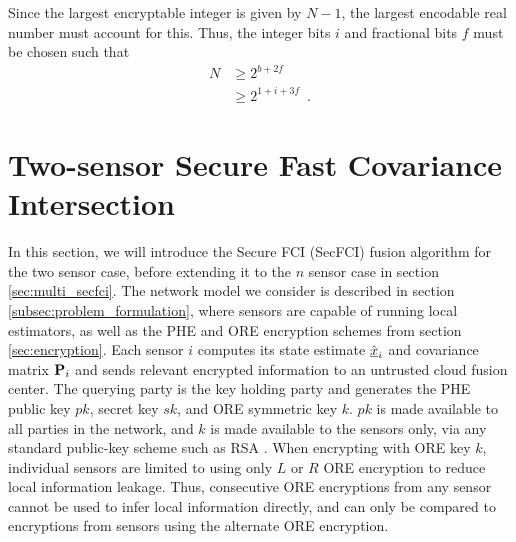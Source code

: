 \documentclass[letterpaper, 10 pt, journal, twoside]{ieeetran}  %
\begin{document}
Since the largest encryptable integer is given by $N-1$, the largest encodable real number must account for this. Thus, the integer bits $i$ and fractional bits $f$ must be chosen such that
\begin{equation}\label{eqn:qmn_max}
   \begin{aligned}
      N &\geq 2^{b+2f}\\
      &\geq 2^{1+i+3f}\enspace.
   \end{aligned}
\end{equation}




\section{Two-sensor Secure Fast Covariance Intersection} \label{sec:secfci}
In this section, we will introduce the Secure FCI (SecFCI) fusion algorithm for the two sensor case, before extending it to the $n$ sensor case in section \ref{sec:multi_secfci}. The network model we consider is described in section \ref{subsec:problem_formulation}, where sensors are capable of running local estimators, as well as the PHE and ORE encryption schemes from section \ref{sec:encryption}. Each sensor $i$ computes its state estimate $\hat{{\underline{x}}}_i$ and covariance matrix ${{\mathbf{P}}}_i$ and sends relevant encrypted information to an untrusted cloud fusion center. The querying party is the key holding party and generates the PHE public key $pk$, secret key $sk$, and ORE symmetric key $k$. $pk$ is made available to all parties in the network, and $k$ is made available to the sensors only, via any standard public-key scheme such as RSA \cite{rivestMethodObtainingDigital1978}. When encrypting with ORE key $k$, individual sensors are limited to using only $L$ or $R$ ORE encryption to reduce local information leakage. Thus, consecutive ORE encryptions from any sensor cannot be used to infer local information directly, and can only be compared to encryptions from sensors using the alternate ORE encryption.
\end{document}
